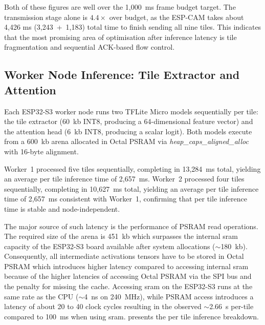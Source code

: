 Both of these figures are well over the 1,000~ms frame budget target. The transmission stage alone is $4.4\times$ over budget, as the ESP-CAM takes about 4,426 ms (3,243~+~1,183) total time to finish sending all nine tiles. This indicates that the most promising area of optimisation after inference latency is tile fragmentation and sequential ACK-based flow control.
 
\subsection{Worker Node Inference: Tile Extractor and Attention}
 
Each ESP32-S3 worker node runs two TFLite Micro models sequentially per tile: the tile
extractor (60~\gls{kb} INT8, producing a 64-dimensional feature vector) and the
attention head (6~\gls{kb} INT8, producing a scalar logit). Both models execute from a
600~\gls{kb} arena allocated in Octal PSRAM via
\textit{heap\_caps\_aligned\_alloc} with 16-byte alignment.
 
Worker~1 processed five tiles sequentially, completing in 13,284~ms total, yielding an
average per tile inference time of 2,657~ms. Worker~2 processed four tiles sequentially,
completing in 10,627~ms total, yielding an average per tile inference time of 2,657~ms
consistent with Worker~1, confirming that per tile inference time is stable and
node-independent.
 
The major source of such latency is the performance of PSRAM read operations. The required size of the arena is 451~\gls{kb} which surpasses the internal \gls{sram} capacity of the ESP32-S3 board available after system allocations ($\sim$180~\gls{kb}). Consequently, all intermediate activations tensors have to be stored in Octal PSRAM which introduces higher latency compared to accessing internal \gls{sram} because of the higher latencies of accessing Octal PSRAM via the SPI bus and the penalty for missing the cache. Accessing \gls{sram} on the ESP32-S3 runs at the same rate as the CPU ($\sim$4~ns on 240~MHz), while PSRAM access introduces a latency of about 20 to 40 clock cycles resulting in the observed $\sim$2.66~s per-tile compared to 100~ms when using \gls{sram}.
 presents the per tile inference breakdown.
 

